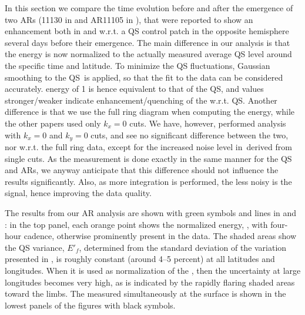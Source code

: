 \documentclass{aa}
\begin{document}
In this section we compare the \fff time evolution before and after the emergence of 
two ARs (11130 in  and AR11105 in ), that were reported to show an enhancement both in \cite{SRB16} and \cite{Waidele22} w.r.t. a QS control patch
in the opposite hemisphere several days before their emergence. The main difference in our analysis
is that the \fff energy is now normalized to the actually measured average QS level
around the specific time and latitude. To minimize
the QS fluctuations, Gaussian smoothing to the QS \ef\,is applied, 
so that the fit to the data can be considered accurately.
\fff energy of 1 is hence
equivalent to that of the QS, and values stronger/weaker 
indicate enhancement/quenching of the \fff w.r.t. QS.
Another difference is that we use the
full ring diagram when computing the \fff energy, while the
other papers used only $k_x=0$ cuts. We have, however, performed
analysis with $k_x=0$ and $k_y=0$ cuts, and see no significant
difference between the two, nor w.r.t. the full ring data, except for the
increased noise level in \ef\,derived from single cuts.
As the measurement is done exactly in the same
manner for the QS and ARs, we anyway anticipate
that this difference should not influence the results significantly. 
Also, as more integration is performed, the less noisy is the 
signal, hence improving the data quality. 

The results from our AR analysis are shown with green symbols and lines in  and : in the top panel, each orange point shows the normalized \fff energy, \eft, with four-hour cadence, 
otherwise prominently present in the data. The shaded areas show the QS variance, $E'_f$,
determined from the standard deviation of the variation presented in ,
is roughly constant (around 4--5 percent) at all latitudes and longitudes. When it is used as normalization of the \fffns, then the uncertainty at large longitudes becomes very high, as is indicated by the rapidly 
flaring 
shaded areas toward the limbs. The \brms{} measured simultaneously at the surface is shown in the lowest panels of the figures with black symbols. 
\end{document}
